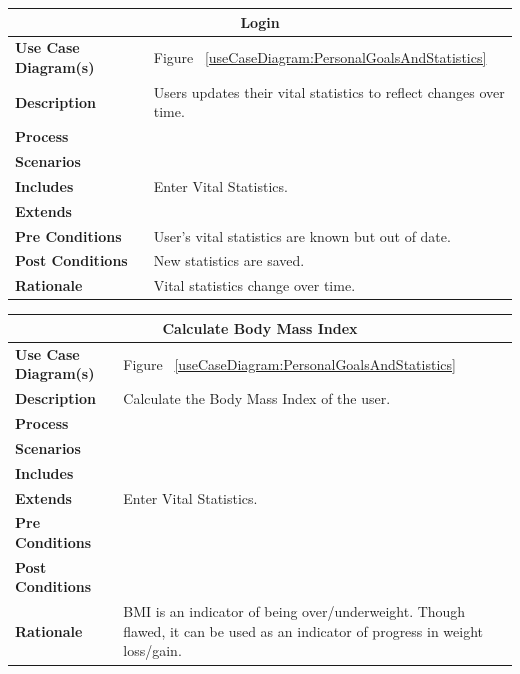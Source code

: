 \documentclass[12pt]{article}
\begin{document}
\begin{center}
\begin{tabularx}{\textwidth}{ |X|X|}
\hline
\multicolumn{2}{|c|}{\textbf{Login}}\\
\hline
\hline
\textbf{Use Case Diagram(s)} & Figure ~\ref{useCaseDiagram:PersonalGoalsAndStatistics}\\ \hline
\textbf{Description} & Users updates their vital statistics to reflect changes over time. \\ \hline
\textbf{Process} & \\ \hline
\textbf{Scenarios} & \\ \hline
\textbf{Includes} & Enter Vital Statistics.\\ \hline
\textbf{Extends} & \\ \hline
\textbf{Pre Conditions} & User's vital statistics are known but out of date.\\ \hline
\textbf{Post Conditions} & New statistics are saved.\\ \hline
\textbf{Rationale} & Vital statistics change over time.\\ \hline
\end{tabularx}
\end{center}


\begin{center}
\begin{tabularx}{\textwidth}{ |X|X|}
\hline
\multicolumn{2}{|c|}{\textbf{Calculate Body Mass Index}}\\
\hline
\hline
\textbf{Use Case Diagram(s)} & Figure ~\ref{useCaseDiagram:PersonalGoalsAndStatistics}\\ \hline
\textbf{Description} & Calculate the Body Mass Index of the user.\\ \hline
\textbf{Process} & \\ \hline
\textbf{Scenarios} & \\ \hline
\textbf{Includes} &  \\ \hline
\textbf{Extends} & Enter Vital Statistics. \\ \hline
\textbf{Pre Conditions} & \\ \hline
\textbf{Post Conditions} &\\ \hline
\textbf{Rationale} & BMI is an indicator of being over/underweight. Though flawed, it can be used as an indicator of progress in weight loss/gain. \\ \hline
\end{tabularx}
\end{center}
\end{document}
